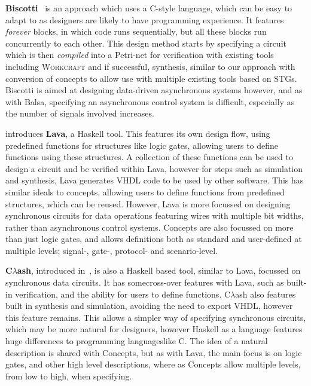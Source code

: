 \documentclass[british, journal]{IEEEtran}
\newcommand{\noun}[1]{\textsc{#1}}
\begin{document}
\textbf{Biscotti}~\cite{5232351} is an approach which uses a C-style language,
which can be easy to adapt to as designers are likely to have programming
experience. It features
\emph{forever} blocks, in which code runs sequentially, but all these
blocks run concurrently to each other. This design method starts by
specifying a circuit which is then
\emph{compiled} into a Petri-net for verification with existing tools
including \noun{Workcraft} and if successful, synthesis, similar to our
approach with conversion of concepts to allow
use with multiple existing tools based on STGs. Biscotti is aimed at
designing data-driven asynchronous systems however, and as with Balsa,
specifying an asynchronous control system is
difficult, especially as the number of signals involved increases.

\cite{bjesse1998lava} introduces \textbf{Lava}, a Haskell tool. This features
its own design flow, using predefined functions for structures like logic gates,
allowing users to define
functions using these structures. A collection of these functions can be used to
design a circuit and be verified within Lava, however for steps such as
simulation and synthesis, Lava
generates VHDL code to be used by other software. This has similar ideals to
concepts, allowing users to define functions from predefined structures, which
can be reused. However,
Lava is more focussed on designing synchronous circuits for data operations
featuring wires with multiple bit widths, rather than asynchronous control
systems. Concepts are also
focussed on more than just logic gates, and allows definitions both as standard
and user-defined at multiple levels; signal-, gate-, protocol- and
scenario-level.

\textbf{C$\lambda$ash}, introduced in~\cite{baaij2009clambdaash}, is also a
Haskell
based tool, similar to Lava, focussed on synchronous data circuits.  It has somecross-over features with Lava, such as built-in verification, and the ability
for
users to define functions.
C$\lambda$ash also features built in synthesis and simulation, avoiding the need
to export VHDL, however this feature remains. This allows a simpler way of
specifying synchronous circuits, which may be more natural for designers,
however Haskell as a language features huge differences to programming languageslike \noun{C}. The idea of a natural description is shared with Concepts,
but as with Lava, the main focus is on logic gates, and other high level
descriptions, where as Concepts allow multiple levels, from low to high, when
specifying.
\end{document}
